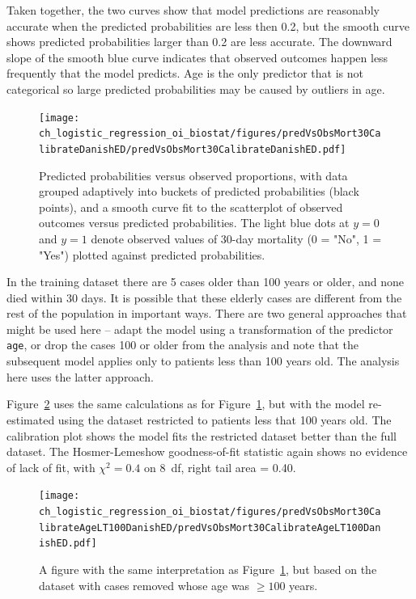 Taken together, the two curves show that model predictions are reasonably accurate when the predicted probabilities are less then 0.2, but the smooth curve shows predicted probabilities larger than 0.2 are less accurate. The downward slope of the smooth blue curve indicates that observed outcomes happen less frequently that the model predicts.   Age is the only predictor that is not categorical so large predicted probabilities may be caused by outliers in age.

\begin{figure}[!tbh]
  \centering
  \texttt{[image: ch\_logistic\_regression\_oi\_biostat/figures/predVsObsMort30CalibrateDanishED/predVsObsMort30CalibrateDanishED.pdf]}
    \caption{Predicted probabilities versus observed proportions, with data grouped adaptively into buckets of predicted probabilities (black points), and a smooth curve fit to the scatterplot of observed outcomes versus predicted probabilities. The light blue dots at  $y = 0$ and $y = 1$ denote observed values of 30-day mortality (0 = "No", 1 = "Yes") plotted against predicted probabilities.}
    \label{figure:predVsObsMort30CalibrateDanishED}
\end{figure}

In the training dataset there are 5 cases older than 100 years or older, and none died within 30 days. It is possible that these elderly cases are different from the rest of the population in important ways. There are two general approaches that might be used here -- adapt the model using a transformation of the predictor \texttt{age}, or drop the cases  100 or older from the analysis and note that the subsequent model applies only to patients less than 100 years old.  The analysis here uses the latter approach.   

Figure~\ref{figure:predVsObsMort30CalibrateAgeLT100DanishED} uses the same calculations as for Figure~\ref{figure:predVsObsMort30CalibrateDanishED}, but with the model re-estimated using the dataset restricted to patients less that 100 years old. The calibration plot shows the model fits the restricted dataset better than the full dataset.  The Hosmer-Lemeshow goodness-of-fit statistic again shows no evidence of lack of fit, with $\chi^2 = 0.4$ on 8~df, right tail area = 0.40.

\begin{figure}[!tbh]
  \centering
  \texttt{[image: ch\_logistic\_regression\_oi\_biostat/figures/predVsObsMort30CalibrateAgeLT100DanishED/predVsObsMort30CalibrateAgeLT100DanishED.pdf]}
    \caption{A figure with the same interpretation as Figure~\ref{figure:predVsObsMort30CalibrateDanishED}, but based on the dataset with cases removed whose age was $\ge 100$ years.}
    \label{figure:predVsObsMort30CalibrateAgeLT100DanishED}
\end{figure}

